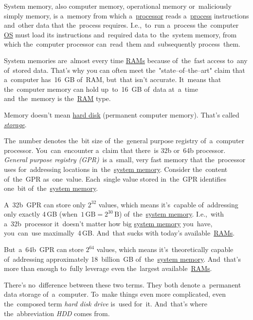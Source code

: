 \label{systemmemory}
System memory, also computer memory, operational memory or~maliciously simply memory, is a~memory from which a~\hyperref[processorcpucore]{processor} reads a~\hyperref[applicationprocessprogramservicethread]{process} instructions and~other data that the~process requires. I.e.,~to~run a~process the~computer \hyperref[os]{OS} must load its instructions and~required data to~the~system memory, from which the~computer processor can~read~them and~subsequently process~them.

System memories are~almost every time \hyperref[ram]{RAMs} because of~the~fast access to~any of~stored data. That's why you can often meet the~"state--of--the--art" claim that a~computer has~16~GB of~RAM, but~that isn't accurate. It~means that the~computer memory can hold up~to~16~GB of~data at~a~time and~the~memory is the~\hyperref[ram]{RAM} type.

\warning Memory doesn't mean \hyperref[harddiskdrive]{hard disk} (permanent computer memory). That's called \hyperref[harddiskdrive]{\textit{storage}}.

\label{32bvs64b}
The~number denotes the~bit size of~the~general purpose registry of~a~computer processor. You~can~encounter a~claim that there~is 32b or~64b processor. \textit{General purpose registry (GPR)}~is a~small, very fast memory that the~processor uses for~addressing locations in~the~\hyperref[systemmemory]{system memory}. Consider the~content of~the~GPR as~one~value. Each~single value stored in~the~GPR identifies one~bit of~the~\hyperref[systemmemory]{system memory}.

A~32b~GPR can store only $2^{32}$ values, which means it's~capable of~addressing only exactly 4\,GB (when~$1\,\textrm{GB}=2^{30}\,\textrm{B}$) of~the~\hyperref[systemmemory]{system memory}. I.e.,~with a~32b~processor it~doesn't matter how big \hyperref[systemmemory]{system memory} you~have, you~can~use maximally~4\,GB. And~that sucks with today's available~\hyperref[ram]{RAMs}.

But~a~64b~GPR can store $2^{64}$ values, which means it's~theoretically capable of~addressing approximately 18~billion~GB of~the~\hyperref[systemmemory]{system memory}. And~that's more than enough to~fully leverage even the~largest available~\hyperref[ram]{RAMs}.

\label{harddiskdrive}
There's no~difference between these two terms. They both denote a~permanent data storage of~a~computer. To~make things even more complicated, even the~composed term \textit{hard disk drive} is~used for~it. And~that's where the~abbreviation \textit{HDD} comes from.

